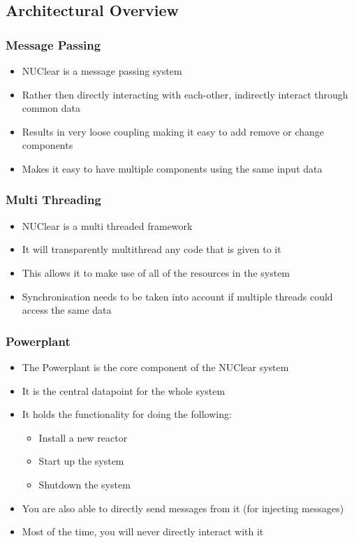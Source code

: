 \documentclass{beamer}
\begin{document}
\subsection{Architectural Overview}
\begin{frame}
	\frametitle{Message Passing}
	\begin{itemize}
		\item NUClear is a message passing system
		\item Rather then directly interacting with each-other, indirectly interact through common data
		\item Results in very loose coupling making it easy to add remove or change components
		\item Makes it easy to have multiple components using the same input data
	\end{itemize}
\end{frame}

\begin{frame}
	\frametitle{Multi Threading}
	\begin{itemize}
		\item NUClear is a multi threaded framework
		\item It will transparently multithread any code that is given to it
		\item This allows it to make use of all of the resources in the system
		\item Synchronisation needs to be taken into account if multiple threads could access the same data
	\end{itemize}
\end{frame}

\begin{frame}
	\frametitle{Powerplant}
	\begin{itemize}
		\item The Powerplant is the core component of the NUClear system
		\item It is the central datapoint for the whole system
		\item It holds the functionality for doing the following:
			\begin{itemize}
				\item Install a new reactor
				\item Start up the system
				\item Shutdown the system
			\end{itemize}
		\item You are also able to directly send messages from it (for injecting messages)
		\item Most of the time, you will never directly interact with it
	\end{itemize}
\end{frame}
\end{document}
